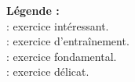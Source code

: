 





{\noindent
{\bf L\'egende :}\\

\noindent \coolexo : exercice int\'eressant.\\
\boringexo : exercice d'entra\^inement.\\
\minsyndical : exercice fondamental.\\
\mortelexo : exercice d\'elicat.}
